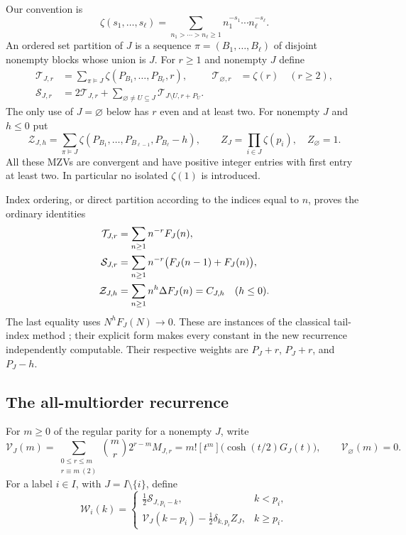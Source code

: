 \documentclass[11pt,letterpaper]{article}
\numberwithin{equation}{section}
\theoremstyle{definition}
\theoremstyle{remark}
\begin{document}
Our convention is
\[
 \zeta(s_1,\ldots,s_\ell)
   =\sum_{n_1>\cdots>n_\ell\ge1}n_1^{-s_1}\cdots n_\ell^{-s_\ell}.
\]
An ordered set partition of $J$ is a sequence
$\pi=(B_1,\ldots,B_\ell)$ of disjoint nonempty blocks whose union is
$J$. For $r\ge1$ and nonempty $J$ define
\begin{align}
 \mathcal T_{J,r}
   &=\sum_{\pi\models J}\zeta(P_{B_1},\ldots,P_{B_\ell},r),
       &\mathcal T_{\varnothing,r}&=\zeta(r)\quad(r\ge2),
       \label{mtp:Tanchor}\\
 \mathcal S_{J,r}
   &=2\mathcal T_{J,r}
       +\sum_{\varnothing\ne U\subseteq J}\mathcal T_{J\setminus U,r+P_U}.
       \label{mtp:Sanchor}
\end{align}
The only use of $J=\varnothing$ below has $r$ even and at least two.
For nonempty $J$ and $h\le0$ put
\begin{equation}\label{mtp:Zanchor}
 \mathcal Z_{J,h}=\sum_{\pi\models J}
       \zeta(P_{B_1},\ldots,P_{B_{\ell-1}},P_{B_\ell}-h),
 \qquad Z_J=\prod_{i\in J}\zeta(p_i),\quad Z_\varnothing=1.
\end{equation}
All these MZVs are convergent and have positive integer entries with
first entry at least two. In particular no isolated $\zeta(1)$ is
introduced.

Index ordering, or direct partition according to the indices equal to
$n$, proves the ordinary identities
\begin{align}
 \mathcal T_{J,r}&=\sum_{n\ge1}n^{-r}F_J(n),\notag\\
 \mathcal S_{J,r}&=\sum_{n\ge1}n^{-r}\bigl(F_J(n-1)+F_J(n)\bigr),
       \label{mtp:anchor-series}\\
 \mathcal Z_{J,h}&=\sum_{n\ge1}n^h\Delta F_J(n)=C_{J,h}\quad(h\le0).
       \notag
\end{align}
The last equality uses $N^hF_J(N)\to0$. These are instances of the
classical tail-index method \cite{Hoffman}; their explicit form
makes every constant in the new recurrence independently computable.
Their respective weights are $P_J+r$, $P_J+r$, and $P_J-h$.

\subsection{The all-multiorder recurrence}

For $m\ge0$ of the regular parity for a nonempty $J$, write
\[
 \mathcal V_J(m)=\sum_{\substack{0\le r\le m\\r\equiv m\ (2)}}
                   \binom mr2^{r-m}M_{J,r}
          =m![t^m]\bigl(\cosh(t/2)G_J(t)\bigr),
 \qquad \mathcal V_\varnothing(m)=0.
\]
For a label $i\in I$, with $J=I\setminus\{i\}$, define
\begin{equation}\label{mtp:W}
 \mathcal W_i(k)=
 \begin{cases}
  \frac12\mathcal S_{J,p_i-k},&k<p_i,\\
  \mathcal V_J(k-p_i)-\frac12\delta_{k,p_i}Z_J,&k\ge p_i.
 \end{cases}
\end{equation}
\end{document}

